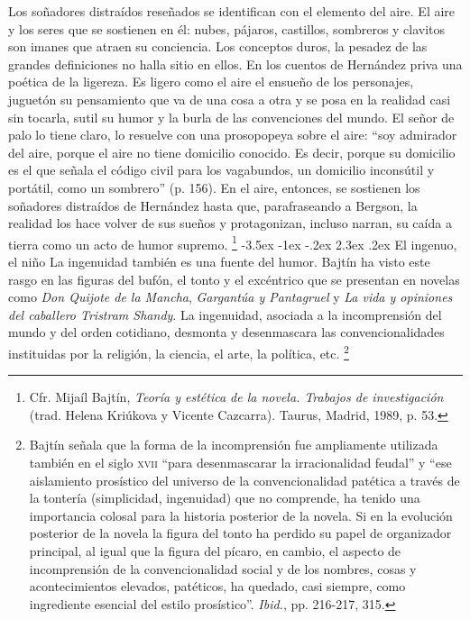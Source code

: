 \documentclass[14pt,twoside,final]{extbook} %
\makeatletter
\let\oldfootnote\footnote
\renewcommand\footnote[1]{%
\oldfootnote{\hspace{1mm}#1}}
\renewcommand\section{\@startsection {section}{1}{\z@}%
                                     {-3.5ex \@plus -1ex \@minus -.2ex}%
                                     {2.3ex \@plus .2ex}%
                                     {\normalfont\large\bfseries\sc}}
\makeatother
\begin{document}
Los soñadores distraídos reseñados se identifican con el elemento del aire. El aire y los seres que se sostienen en él: nubes, pájaros, castillos, sombreros y clavitos son imanes que atraen su conciencia. Los conceptos duros, la pesadez de las grandes definiciones no halla sitio en ellos. En los cuentos de Hernández priva una poética de la ligereza. Es ligero como el aire el ensueño de los personajes, juguetón su pensamiento que va de una cosa a otra y se posa en la realidad casi sin tocarla, sutil su humor y la burla de las convenciones del mundo. El señor de palo lo tiene claro, lo resuelve con una prosopopeya sobre el aire: ``soy admirador del aire, porque el aire no tiene domicilio conocido. Es decir, porque su domicilio es el que señala el código civil para los vagabundos, un domicilio inconsútil y portátil, como un sombrero'' (p. 156). En el aire, entonces, se sostienen los soñadores distraídos de Hernández hasta que, parafraseando a Bergson, la realidad los hace volver de sus sueños y protagonizan, incluso narran, su caída a tierra como un acto de humor supremo.\footnote{Cfr. Mijaíl Bajtín, \emph{Teoría y estética de la novela. Trabajos de investigación} (trad. Helena Kriúkova y Vicente Cazcarra). Taurus, Madrid, 1989, p. 53.}
\section{El ingenuo, el niño}\label{sec:el-ingenuo-el-nino}
La ingenuidad también es una fuente del humor. Bajtín ha visto este rasgo en las figuras del bufón, el tonto y el excéntrico que se presentan en novelas como \emph{Don Quijote de la Mancha}, \emph{Gargantúa y Pantagruel} y \emph{La vida y opiniones del caballero Tristram Shandy}. La ingenuidad, asociada a la incomprensión del mundo y del orden cotidiano, desmonta y desenmascara las convencionalidades instituidas por la religión, la ciencia, el arte, la política, etc.\footnote{Bajtín señala que la forma de la incomprensión fue ampliamente utilizada también en el siglo \textsc{xvii} ``para desenmascarar la irracionalidad feudal'' y ``ese aislamiento prosístico del universo de la convencionalidad patética a través de la tontería (simplicidad, ingenuidad) que no comprende, ha tenido una importancia colosal para la historia posterior de la novela. Si en la evolución posterior de la novela la figura del tonto ha perdido su papel de organizador principal, al igual que la figura del pícaro, en cambio, el aspecto de incomprensión de la convencionalidad social y de los nombres, cosas y acontecimientos elevados, patéticos, ha quedado, casi siempre, como ingrediente esencial del estilo prosístico''. \emph{Ibid.}, pp. 216-217, 315.}
\end{document}
